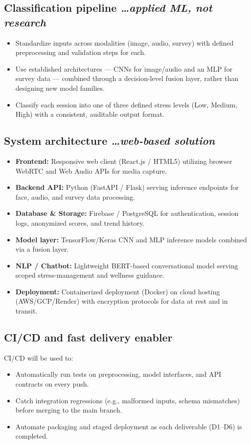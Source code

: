 \documentclass[11pt,a4paper]{article}
\newcommand{\BvrHint}[1]{%
  {\normalfont\normalsize\itshape\hfill #1}}
\begin{document}
\subsection{Classification pipeline %
\BvrHint{\ldots applied ML, not research}}
\begin{itemize}[leftmargin=0.7cm]
    \item Standardize inputs across modalities (image, audio, survey) with defined preprocessing and validation steps for each.
    \item Use established architectures --- CNNs for image/audio and an MLP for survey data --- combined through a decision-level fusion layer, rather than designing new model families.
    \item Classify each session into one of three defined stress levels (Low, Medium, High) with a consistent, auditable output format.
\end{itemize}

\subsection{System architecture %
\BvrHint{\ldots web-based solution}}
\begin{itemize}[leftmargin=0.7cm]
    \item \textbf{Frontend:} Responsive web client (React.js / HTML5) utilizing browser WebRTC and Web Audio APIs for media capture.
    \item \textbf{Backend API:} Python (FastAPI / Flask) serving inference endpoints for face, audio, and survey data processing.
    \item \textbf{Database \& Storage:} Firebase / PostgreSQL for authentication, session logs, anonymized scores, and trend history.
    \item \textbf{Model layer:} TensorFlow/Keras CNN and MLP inference models combined via a fusion layer.
    \item \textbf{NLP / Chatbot:} Lightweight BERT-based conversational model serving scoped stress-management and wellness guidance.
    \item \textbf{Deployment:} Containerized deployment (Docker) on cloud hosting (AWS/GCP/Render) with encryption protocols for data at rest and in transit.
\end{itemize}

\subsection{CI/CD and fast delivery enabler}
CI/CD will be used to:
\begin{itemize}[leftmargin=0.7cm]
    \item Automatically run tests on preprocessing, model interfaces, and API contracts on every push.
    \item Catch integration regressions (e.g., malformed inputs, schema mismatches) before merging to the main branch.
    \item Automate packaging and staged deployment as each deliverable (D1--D6) is completed.
\end{itemize}
\end{document}
